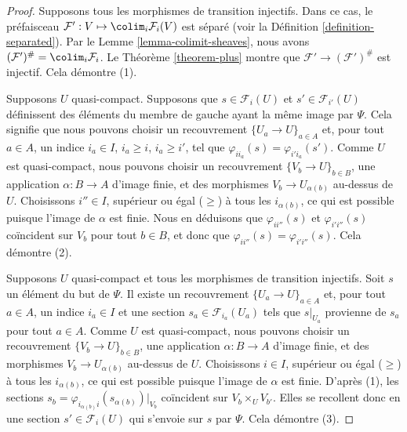 \begin{proof}
Supposons tous les morphismes de transition injectifs. Dans ce cas, le préfaisceau
$\mathcal{F}' : V \mapsto \colim_i \mathcal{F}_i(V)$ est
séparé (voir la Définition \ref{definition-separated}).
Par le Lemme \ref{lemma-colimit-sheaves}, nous avons
$(\mathcal{F}')^\# = \colim_i \mathcal{F}_i$.
Le Théorème \ref{theorem-plus}
montre que $\mathcal{F}' \to (\mathcal{F}')^\#$ est injectif.
Cela démontre (1).

\medskip\noindent
Supposons $U$ quasi-compact. Supposons que $s \in \mathcal{F}_i(U)$ et
$s' \in \mathcal{F}_{i'}(U)$ définissent des éléments du
membre de gauche ayant la même image par $\Psi$.
Cela signifie que nous pouvons choisir un recouvrement $\{U_a \to U\}_{a \in A}$
et, pour tout $a \in A$, un indice $i_a \in I$, $i_a \geq i$, $i_a \geq i'$,
tel que $\varphi_{ii_a}(s) = \varphi_{i'i_a}(s')$.
Comme $U$ est quasi-compact, nous pouvons choisir un recouvrement
$\{V_b \to U\}_{b \in B}$, une application $\alpha : B \to A$ d’image finie,
et des morphismes $V_b \to U_{\alpha(b)}$ au-dessus de $U$.
Choisissons $i''\in I$, supérieur ou égal ($\geq$) à tous les $i_{\alpha(b)}$,
ce qui est possible puisque l’image de $\alpha$ est finie.
Nous en déduisons que $\varphi_{ii''}(s)$ et $\varphi_{i'i''}(s)$
coïncident sur $V_b$ pour tout $b \in B$, et donc que
$\varphi_{ii''}(s) = \varphi_{i'i''}(s)$. Cela démontre (2).

\medskip\noindent
Supposons $U$ quasi-compact et tous les morphismes de transition injectifs.
Soit $s$ un élément du but de $\Psi$. Il existe un recouvrement
$\{U_a \to U\}_{a \in A}$ et, pour tout $a \in A$, un indice $i_a \in I$
et une section $s_a \in \mathcal{F}_{i_a}(U_a)$
tels que $s|_{U_a}$ provienne de $s_a$ pour tout $a \in A$.
Comme $U$ est quasi-compact, nous pouvons choisir un recouvrement
$\{V_b \to U\}_{b \in B}$, une application $\alpha : B \to A$ d’image finie,
et des morphismes $V_b \to U_{\alpha(b)}$ au-dessus de $U$.
Choisissons $i \in I$, supérieur ou égal ($\geq$) à tous les $i_{\alpha(b)}$,
ce qui est possible puisque l’image de $\alpha$ est finie.
D’après (1), les sections
$s_b = \varphi_{i_{\alpha(b)} i}(s_{\alpha(b)})|_{V_b}$
coïncident sur $V_b \times_U V_{b'}$.
Elles se recollent donc en une section
$s' \in \mathcal{F}_i(U)$ qui s’envoie sur $s$ par $\Psi$.
Cela démontre (3).


\end{proof}
